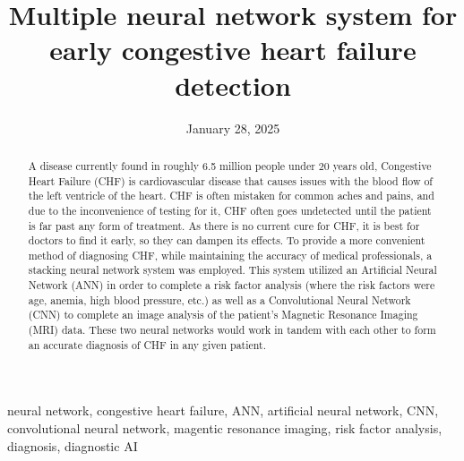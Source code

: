 ﻿\documentclass[12pt,conference,onecolumn]{IEEEtran}
\title{Multiple neural network system for early congestive heart failure detection}
\author{\IEEEauthorblockN{Ryan Edwards}\IEEEauthorblockA{Science \& Engineering\\Manalapan High School\\Englishtown, NJ\\425redwards@frhsd.com}}
\date{January 28, 2025}
\newcommand{\keywords}{neural network, congestive heart failure, ANN, artificial neural network, CNN, convolutional neural network, magentic resonance imaging, risk factor analysis, diagnosis, diagnostic AI}
\begin{document}
\maketitle 

\begin{abstract}
A disease currently found in roughly 6.5 million people under 20 years old, Congestive Heart Failure (CHF) is cardiovascular disease that causes issues with the blood flow of the left ventricle of the heart. CHF is often mistaken for common aches and pains, and due to the inconvenience of testing for it, CHF often goes undetected until the patient is far past any form of treatment. As there is no current cure for CHF, it is best for doctors to find it early, so they can dampen its effects. To provide a more convenient method of diagnosing CHF, while maintaining the accuracy of medical professionals, a stacking neural network system was employed. This system utilized an Artificial Neural Network (ANN) in order to complete a risk factor analysis (where the risk factors were age, anemia, high blood pressure, etc.) as well as a Convolutional Neural Network (CNN) to complete an image analysis of the patient’s Magnetic Resonance Imaging (MRI) data. These two neural networks would work in tandem with each other to form an accurate diagnosis of CHF in any given patient.
\end{abstract}

\begin{IEEEkeywords}
\keywords
\end{IEEEkeywords}
\end{document}
